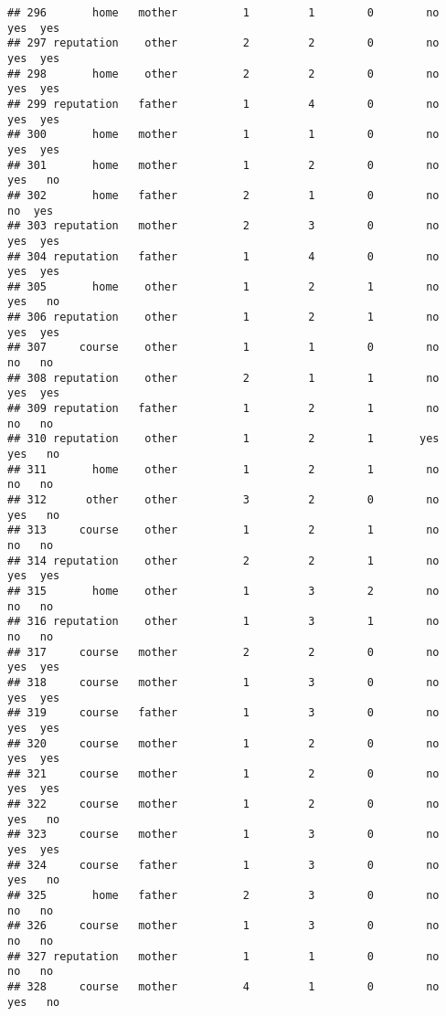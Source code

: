 \documentclass[
]{article}
\begin{document}
\begin{verbatim}
## 296       home   mother          1         1        0        no    yes  yes
## 297 reputation    other          2         2        0        no    yes  yes
## 298       home    other          2         2        0        no    yes  yes
## 299 reputation   father          1         4        0        no    yes  yes
## 300       home   mother          1         1        0        no    yes  yes
## 301       home   mother          1         2        0        no    yes   no
## 302       home   father          2         1        0        no     no  yes
## 303 reputation   mother          2         3        0        no    yes  yes
## 304 reputation   father          1         4        0        no    yes  yes
## 305       home    other          1         2        1        no    yes   no
## 306 reputation    other          1         2        1        no    yes  yes
## 307     course    other          1         1        0        no     no   no
## 308 reputation    other          2         1        1        no    yes  yes
## 309 reputation   father          1         2        1        no     no   no
## 310 reputation    other          1         2        1       yes    yes   no
## 311       home    other          1         2        1        no     no   no
## 312      other    other          3         2        0        no    yes   no
## 313     course    other          1         2        1        no     no   no
## 314 reputation    other          2         2        1        no    yes  yes
## 315       home    other          1         3        2        no     no   no
## 316 reputation    other          1         3        1        no     no   no
## 317     course   mother          2         2        0        no    yes  yes
## 318     course   mother          1         3        0        no    yes  yes
## 319     course   father          1         3        0        no    yes  yes
## 320     course   mother          1         2        0        no    yes  yes
## 321     course   mother          1         2        0        no    yes  yes
## 322     course   mother          1         2        0        no    yes   no
## 323     course   mother          1         3        0        no    yes  yes
## 324     course   father          1         3        0        no    yes   no
## 325       home   father          2         3        0        no     no   no
## 326     course   mother          1         3        0        no     no   no
## 327 reputation   mother          1         1        0        no     no   no
## 328     course   mother          4         1        0        no    yes   no

\end{verbatim}
\end{document}
